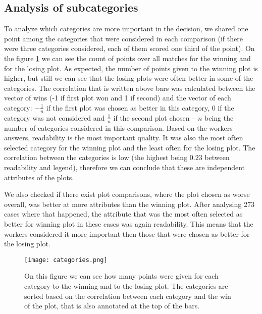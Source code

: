 \documentclass[fleqn,moreauthors,10pt]{ds_report}
\begin{document}
\subsection*{Analysis of subcategories}
To analyze which categories are more important in the decision, we shared one point among the categories that were considered in each comparison (if there were three categories considered, each of them scored one third of the point).
On the figure \ref{categories_count} we can see the count of points over all matches for the winning and for the losing plot. As expected, the number of points given to the winning plot is higher, but still we can see that the losing plots were often better in some of the categories. The correlation that is written above bars was calculated between the vector of wins (-1 if first plot won and 1 if second) and the vector of each category: $-\frac{1}{n}$ if the first plot was chosen as better in this category, 0 if the category was not considered and $\frac{1}{n}$ if the second plot chosen -- $n$ being the number of categories considered in this comparison.
Based on the workers answers, readability is the most important quality. It was also the most often selected category for the winning plot and the least often for the losing plot.
The correlation between the categories is low (the highest being $0.23$ between readability and legend), therefore we can conclude that these are independent attributes of the plots.

We also checked if there exist plot comparisons, where the plot chosen as worse overall, was better at more attributes than the winning plot. After analysing 273 cases where that happened, the attribute that was the most often selected as better for winning plot in these cases was again readability. This means that the workers considered it more important then those that were chosen as better for the losing plot.

\begin{figure}
	\texttt{[image: categories.png]}
	\caption{On this figure we can see how many points were given for each category to the winning and to the losing plot. The categories are sorted based on the correlation between each category and the win of the plot, that is also annotated at the top of the bars.}
	\label{categories_count}
\end{figure}


\end{document}
